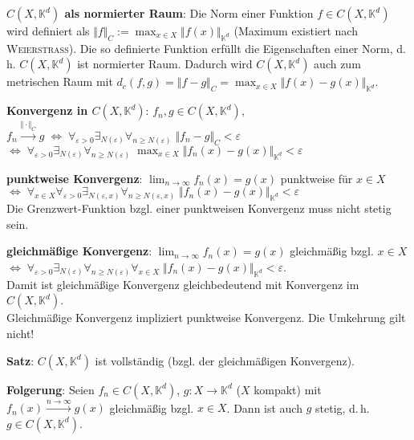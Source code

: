 \textbf{$C(X, \mathbb{K}^d)$ als normierter Raum}:
Die Norm einer Funktion $f \in C(X, \mathbb{K}^d)$ wird definiert als
$\Vert f \Vert_C := \max_{x \in X} \Vert f(x) \Vert_{\mathbb{K}^d}$
(Maximum existiert nach \textsc{Weierstraß}).
Die so definierte Funktion erfüllt die Eigenschaften einer Norm,
d.\,h. $C(X, \mathbb{K}^d)$ ist normierter Raum.
Dadurch wird $C(X, \mathbb{K}^d)$ auch zum metrischen Raum mit
$d_c(f,g) = \Vert f - g \Vert_C =
\max_{x \in X} \Vert f(x) - g(x) \Vert_{\mathbb{K}^d}$.

\linie

\textbf{Konvergenz in $C(X, \mathbb{K}^d)$}:
$f_n, g \in C(X, \mathbb{K}^d)$, \quad
$f_n \xrightarrow{\Vert \cdot \Vert_C} g \;\Leftrightarrow\;
\forall_{\varepsilon > 0} \exists_{N(\varepsilon)}
\forall_{n \ge N(\varepsilon)}\; \Vert f_n - g \Vert_C < \varepsilon$ \\
$\Leftrightarrow\; \forall_{\varepsilon > 0} \exists_{N(\varepsilon)}
\forall_{n \ge N(\varepsilon)}\;
\max_{x \in X} \Vert f_n(x) - g(x) \Vert_{\mathbb{K}^d} < \varepsilon$

\textbf{punktweise Konvergenz}:
$\lim_{n \to \infty} f_n(x) = g(x)$ punktweise für $x \in X$ \\
$\Leftrightarrow\; \forall_{x \in X} \forall_{\varepsilon > 0}
\exists_{N(\varepsilon, x)} \forall_{n \ge N(\varepsilon, x)}\;
\Vert f_n(x) - g(x) \Vert_{\mathbb{K}^d} < \varepsilon$ \\
Die Grenzwert-Funktion bzgl. einer punktweisen Konvergenz muss nicht stetig
sein.

\textbf{gleichmäßige Konvergenz}:
$\lim_{n \to \infty} f_n(x) = g(x)$ gleichmäßig bzgl. $x \in X$ \\
$\Leftrightarrow\; \forall_{\varepsilon > 0} \exists_{N(\varepsilon)}
\forall_{n \ge N(\varepsilon)} \forall_{x \in X}\;
\Vert f_n(x) - g(x) \Vert_{\mathbb{K}^d} < \varepsilon$. \\
Damit ist gleichmäßige Konvergenz gleichbedeutend mit Konvergenz im
$C(X, \mathbb{K}^d)$. \\
Gleichmäßige Konvergenz impliziert punktweise Konvergenz.
Die Umkehrung gilt nicht!

\textbf{Satz}: $C(X, \mathbb{K}^d)$ ist vollständig
(bzgl. der gleichmäßigen Konvergenz).

\textbf{Folgerung}: Seien $f_n \in C(X, \mathbb{K}^d)$,
$g: X \rightarrow \mathbb{K}^d$ ($X$ kompakt) mit
$f_n(x) \xrightarrow{n \to \infty} g(x)$ gleichmäßig bzgl. $x \in X$.
Dann ist auch $g$ stetig, d.\,h. $g \in C(X, \mathbb{K}^d)$.

\pagebreak
